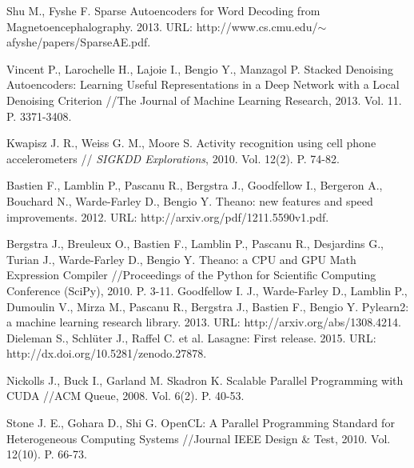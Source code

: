 \documentclass[12pt,notitlepage]{article}
\begin{document}
\begin{thebibliography}{10}
{Shu M.,  Fyshe F.}
Sparse Autoencoders for Word Decoding from Magnetoencephalography. 2013. URL: http://www.cs.cmu.edu/$\sim$afyshe/papers/SparseAE.pdf.

{Vincent P., Larochelle H., Lajoie I., Bengio Y., Manzagol P.}
Stacked Denoising Autoencoders: Learning Useful Representations in
a Deep Network with a Local Denoising Criterion //{The Journal of Machine Learning Research}, 2013. Vol. 11. P. 3371-3408.




{Kwapisz J. R., Weiss G. M.,  Moore S.}
Activity recognition using cell phone
accelerometers // \emph{SIGKDD Explorations}, 2010. Vol. 12(2). P. 74-82.

{Bastien F., Lamblin P., Pascanu R., Bergstra J., Goodfellow I., Bergeron A., Bouchard N., Warde-Farley D.,  Bengio Y.}
Theano: new features and speed improvements. 2012. URL:  http://arxiv.org/pdf/1211.5590v1.pdf.

{Bergstra J., Breuleux O., Bastien F., Lamblin P., Pascanu R., Desjardins G., Turian J., Warde-Farley D., Bengio Y.}
Theano: a {CPU} and {GPU} Math Expression Compiler //{Proceedings of the Python for Scientific Computing Conference ({SciPy})}, 2010. P. 3-11.
%
{Goodfellow I. J.,  Warde-Farley D., Lamblin P., Dumoulin V., Mirza M., Pascanu R., Bergstra J., Bastien F., Bengio Y.}
Pylearn2: a machine learning research library. 2013. URL: http://arxiv.org/abs/1308.4214.
%
{Dieleman S., Schlüter J.,  Raffel C. et al.}
{Lasagne: First release.} 2015. URL: http://dx.doi.org/10.5281/zenodo.27878.

{Nickolls J.,  Buck I., Garland M. Skadron K.}
Scalable Parallel Programming with CUDA //{ACM Queue}, 2008. Vol. 6(2). P. 40-53.

{Stone  J. E.,   Gohara D.,  Shi G.}
OpenCL: A Parallel Programming Standard for Heterogeneous Computing Systems
//{Journal
IEEE Design \& Test}, 2010. Vol. 12(10). P. 66-73.


\end{thebibliography}
\end{document}
